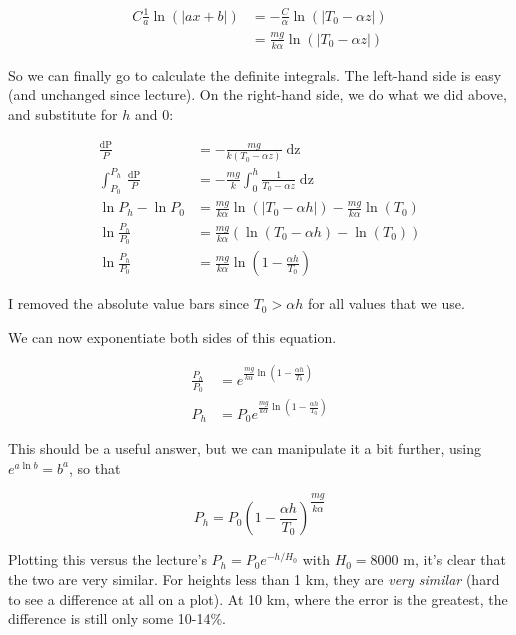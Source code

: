 \documentclass[8.01x]{subfiles}
\begin{document}
\begin{align}
C \frac{1}{a} \ln (|ax + b|) &= -\frac{C}{\alpha} \ln (|T_0 - \alpha z|)\\
                                     &= \frac{m g}{k \alpha} \ln (|T_0 - \alpha z|)
\end{align}

So we can finally go to calculate the definite integrals. The left-hand side is easy (and unchanged since lecture). On the right-hand side, we do what we did above, and substitute for $h$ and $0$:

\begin{align}
\frac{\mathop{dP}}{P} &= - \frac{mg}{k (T_0 - \alpha z)} \mathop{dz}\\
\int_{P_0}^{P_h} \frac{\mathop{dP}}{P} &= - \frac{mg}{k} \int_0^h \frac{1}{T_0 - \alpha z} \mathop{dz}\\
\ln P_h - \ln P_0 &= \frac{m g}{k \alpha} \ln (|T_0 - \alpha h|) - \frac{m g}{k \alpha} \ln (T_0)\\
\ln \frac{P_h}{P_0} &= \frac{m g}{k \alpha} \left( \ln (T_0 - \alpha h) - \ln (T_0)\right)\\
\ln \frac{P_h}{P_0} &= \frac{m g}{k \alpha} \ln (1 - \frac{\alpha h}{T_0})
\end{align}

I removed the absolute value bars since $T_0 > \alpha h$ for all values that we use.

We can now exponentiate both sides of this equation.

\begin{align}
\frac{P_h}{P_0} &= e^{\frac{m g}{k \alpha} \ln (1 - \frac{\alpha h}{T_0})}\\
P_h &= P_0 e^{\frac{m g}{k \alpha} \ln (1 - \frac{\alpha h}{T_0})}
\end{align}

This should be a useful answer, but we can manipulate it a bit further, using $e^{a \ln b} = b^a$, so that

\begin{equation}
P_h = P_0 \left(1 - \frac{\alpha h}{T_0}\right)^{\dfrac{m g}{k \alpha}}
\end{equation}

Plotting this versus the lecture's $P_h = P_0 e^{-h/H_0}$ with $H_0 = 8000$ m, it's clear that the two are very similar. For heights less than 1 km, they are \emph{very similar} (hard to see a difference at all on a plot). At 10 km, where the error is the greatest, the difference is still only some 10-14\%.
\end{document}
